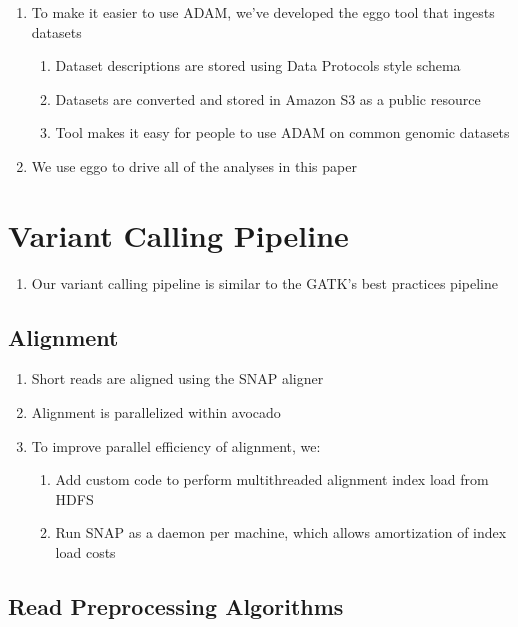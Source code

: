 \documentclass{nature}
\begin{document}
\begin{methods}
\begin{refsegment}
\begin{enumerate}
\item To make it easier to use ADAM, we've developed the eggo tool that ingests datasets
\begin{enumerate}
\item Dataset descriptions are stored using Data Protocols style schema~\cite{dataprotocols}
\item Datasets are converted and stored in Amazon S3 as a public resource
\item Tool makes it easy for people to use ADAM on common genomic datasets
\end{enumerate}
\item We use eggo to drive all of the analyses in this paper
\end{enumerate}

\section{Variant Calling Pipeline}
\label{sec:variant-calling}

\begin{enumerate}
\item Our variant calling pipeline is similar to the GATK's best practices
pipeline~\cite{auwera13}
\end{enumerate}

\subsection{Alignment}
\label{sec:alignment}

\begin{enumerate}
\item Short reads are aligned using the SNAP aligner~\cite{zaharia11}
\item Alignment is parallelized within avocado
\item To improve parallel efficiency of alignment, we:
\begin{enumerate}
\item Add custom code to perform multithreaded alignment index load from HDFS
\item Run SNAP as a daemon per machine, which allows amortization of index load costs
\end{enumerate}
\end{enumerate}

\subsection{Read Preprocessing Algorithms}
\label{sec:read-preprocessing-algorithm}


\end{refsegment}
\end{methods}
\end{document}
